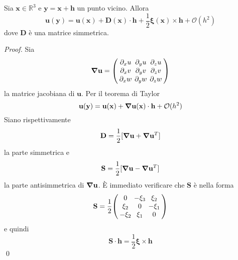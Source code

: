 \begin{theorem}
Sia $\mathbf{x} \in \mathbb{R}^3$ e $\mathbf{y} = \mathbf{x} + \mathbf{h}$ un punto vicino. Allora 
\begin{equation}\label{eq:helmoltz}
\mathbf{u}(\mathbf{y}) = \mathbf{u}(\mathbf{x}) + \mathbf{D}(\mathbf{x}) \cdot \mathbf{h} + \frac{1}{2} \boldsymbol{\xi}(\mathbf{x}) \times \mathbf{h} + \mathcal{O} ( h^2)
\end{equation}
dove $\mathbf{D}$ è una matrice simmetrica.
\end{theorem}
\begin{proof}
Sia
\begin{equation}
\Nabla\mathbf{u}={\setlength\arraycolsep{2pt} 
\left(\begin{array}{ccc} 
\partial_x u&  \partial_y u &\partial_z u\\ 
\partial_x v&  \partial_y v &\partial_z v\\ 
\partial_x w&  \partial_y w &\partial_z w\\
\end{array}\right) 
}
\end{equation}
la matrice jacobiana di $\mathbf{u}$.
Per il teorema di Taylor
\begin{equation*}
\mathbf{u}(\mathbf{y}) = \mathbf{u}(\mathbf{x}) + \boldsymbol{\nabla}\mathbf{u}(\mathbf{x}) \cdot \mathbf{h} + \mathcal{O} ( h^2)
\end{equation*}
Siano rispettivamente
\begin{equation*}
\mathbf{D} = \frac{1}{2} [ \boldsymbol{\nabla}\mathbf{u} + \boldsymbol{\nabla}\mathbf{u} ^T]
\end{equation*}
la parte simmetrica e
\begin{equation*}
\mathbf{S} = \frac{1}{2} [ \boldsymbol{\nabla}\mathbf{u} - \boldsymbol{\nabla}\mathbf{u} ^T]
\end{equation*}
la parte antisimmetrica di $ \boldsymbol{\nabla}\mathbf{u}$.
\`E immediato verificare che $\mathbf{S}$ è nella forma
\begin{equation}
\mathbf{S}=\frac{1}{2}{\setlength\arraycolsep{2pt} 
\left(\begin{array}{ccc} 
0&  -\xi_3 &\xi_2\\ 
\xi_2&  0 &-\xi_1\\ 
-\xi_2&  \xi_1 &0\\
\end{array}\right) 
}
\end{equation}
e quindi
\begin{equation*}
\mathbf{S} \cdot \mathbf{h} = \frac{1}{2} \boldsymbol{\xi} \times \mathbf{h}
\end{equation*}
\qed
\end{proof}

